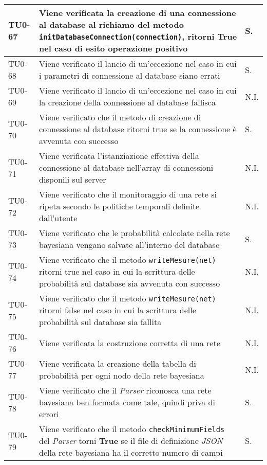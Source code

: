 \begin{longtable}{|C{.15\textwidth}|m{.66\textwidth}|C{.10\textwidth}|}
\hline
{}TU0-67 &  Viene verificata la creazione di una connessione al database al richiamo del metodo \texttt{initDatabaseConnection(connection)}, ritorni \textbf{True} nel caso di esito operazione positivo & S.\\ 
\hline
TU0-68 & Viene verificato il lancio di un'eccezione nel caso in cui i parametri di connessione al database siano errati & S. \\
\hline
{} TU0-69 & Viene verificato il lancio di un'eccezione nel caso in cui la creazione della connessione al database fallisca & N.I. \\ 
\hline
TU0-70 & Viene verificato che il metodo di creazione di connessione al database ritorni true se la connessione è avvenuta con successo & S. \\ 
\hline 
{} TU0-71 & Viene verificata l'istanziazione effettiva della connessione al database nell'array di connessioni disponili sul server & N.I. \\ 
\hline 
TU0-72 & Viene verificato che il monitoraggio di una rete si ripeta secondo le politiche temporali definite dall'utente & N.I. \\ 
\hline 
{} TU0-73 & Viene verificato che le probabilità calcolate nella rete bayesiana vengano salvate all'interno del database  & S. \\ 
\hline 
TU0-74 & Viene verificato che il metodo \texttt{writeMesure(net)}  ritorni true nel caso in cui la scrittura delle probabilità sul database sia avvenuta con successo & N.I. \\
\hline
{}TU0-75 & Viene verificato che il metodo \texttt{writeMesure(net)} ritorni false nel caso in cui la scrittura delle probabilità sul database sia fallita & N.I. \\ 
\hline
TU0-76 & Viene verificata la costruzione corretta di una rete & N.I.  \\ 
\hline 
{}TU0-77 & Viene verificata la creazione della tabella di probabilità per ogni nodo della rete bayesiana & N.I. \\ 
\hline
TU0-78 & Viene verificato che il \textit{Parser} riconosca una rete bayesiana ben formata come tale, quindi priva di errori & S. \\
\hline
{}TU0-79 & Viene verificato che il metodo \texttt{checkMinimumFields} del \textit{Parser} torni \textbf{True} se il file di definizione \textit{JSON} della rete bayesiana ha il corretto numero di campi & S.\\

\end{longtable}
